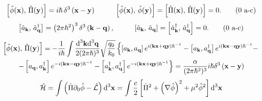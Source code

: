 \begin{subequations}
	\begin{gather}
		\left[\hat{\phi}(\mathbf{x}),\,\hat{\Pi}(\mathbf{y})\right]=i\hbar \,\delta^3\left(\mathbf{x}-\mathbf{y}\right)\hspace{1.0cm}\left[\hat{\phi}(\mathbf{x}),\,\hat{\phi}(\mathbf{y})\right]=\left[\hat{\Pi}(\mathbf{x}),\,\hat{\Pi}(\mathbf{y})\right]=0.\tag{\theequation \,\,a-c}
	\end{gather}
\end{subequations}
\begin{subequations}\label{eq: general a operator commutator rules}
	\begin{gather}
		\left[\hat{a}_\mathbf{k},\,\hat{a}_\mathbf{q}^\dagger\right]=\left(2\pi\hbar^2\right)^3 \delta^3\left(\mathbf{k}-\mathbf{q}\right),\hspace{1.0cm}\left[\hat{a}_\mathbf{k},\,\hat{a}_\mathbf{q}\right]=\left[\hat{a}_\mathbf{k}^\dagger,\,\hat{a}_\mathbf{q}^\dagger\right]=0.\tag{\theequation \,\,a-c}
	\end{gather}
\end{subequations}
\begin{multline}
	\left[\hat{\phi}(\mathbf{x}),\,\hat{\Pi}(\mathbf{y})\right]=-\frac{1}{i\hbar}\int\frac{\text{d}^3\mathbf{k}\text{d}^3\mathbf{q}}{2(2\pi\hbar)^3}\sqrt{\frac{q_0}{k_0}}	\left\{\left[a_\mathbf{k},a_\mathbf{q}\right]e^{i\left(\mathbf{kx}+\mathbf{qy}\right)\hbar^{-1}}-\left[a_\mathbf{k},a_\mathbf{q}^\dagger\right]e^{i\left(\mathbf{kx}-\mathbf{qy}\right)\hbar^{-1}}-\right.\\
	\left.-\left[a_\mathbf{q},a_\mathbf{k}^\dagger\right]e^{-i\left(\mathbf{kx}-\mathbf{qy}\right)\hbar^{-1}}-\left[a_\mathbf{k}^\dagger,a_\mathbf{q}^\dagger\right]e^{-i\left(\mathbf{kx}+\mathbf{qy}\right)\hbar^{-1}}\right\}=\frac{\alpha}{(2\pi\hbar^2)^3}i\hbar\delta^3\left(\mathbf{x}-\mathbf{y}\right)
\end{multline}
\begin{equation}
	\hat{\mathcal{H}}=\int\left(\hat{\Pi}\partial_{0}\hat{\phi}-\hat{\mathcal{L}}\right)\text{d}^3\mathbf{x}=\int\frac{c}{2}\left[\hat{\Pi}^2+\left(\mathbf{\nabla}\hat{\phi}\right)^2+\mu^2\hat{\phi}^2\right]\text{d}^3\mathbf{x}
\end{equation}